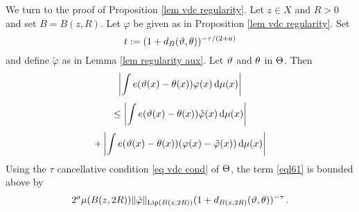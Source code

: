 We turn to the proof of Proposition \ref{lem vdc regularity}.
Let $z\in X$ and $R>0$ and set $B=B(z,R)$. Let $\varphi$
be given as in Proposition \ref{lem vdc regularity}.
Set
\begin{equation}\label{eql69}
    t:=(1+d_B(\vartheta,\theta))^{-\tau/(2+a)}
\end{equation}
and define $\tilde{\varphi}$ as in Lemma \ref{lem regularity aux}. Let $\vartheta$ and $\theta$ in $\Theta$.
Then
    \begin{equation}\label{eql60}
        \left|\int e(\vartheta(x)-{\theta(x)}) \varphi (x)\, \mathrm{d}\mu(x)\right|
    \end{equation}
        \begin{equation}\label{eql61}
    \le     \left|\int e(\vartheta(x)-{\theta(x)}) \tilde{\varphi} (x)\, \mathrm{d}\mu(x)\right|
    \end{equation}
            \begin{equation}\label{eql62}
        +  \left|\int e(\vartheta(x)-{\theta(x)}) (\varphi (x)-\tilde{\varphi}(x))\, \mathrm{d}\mu(x)\right|
    \end{equation}
Using the $\tau$ cancellative condition \eqref{eq vdc cond}  of $\Theta$, the term \eqref{eql61} is bounded above by
    \begin{equation}\label{eql63}
        2^a \mu(B(z,2R)) \|\tilde{\varphi}\|_{\operatorname{\operatorname{Lip}}(B(z,2R))} (1 + d_{B(z,2R)}(\vartheta,\theta))^{-\tau}  \, .
    \end{equation}



